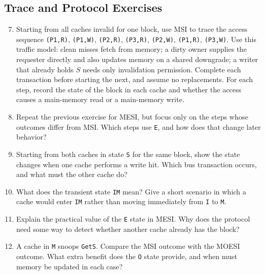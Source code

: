 \subsection*{Trace and Protocol Exercises}
\begin{enumerate}
    \setcounter{enumi}{6}
    \setlength{\itemsep}{0.45em}
    \item Starting from all caches invalid for one block, use MSI to trace the access sequence \texttt{(P1,R)}, \texttt{(P1,W)}, \texttt{(P2,R)}, \texttt{(P3,R)}, \texttt{(P2,W)}, \texttt{(P1,R)}, \texttt{(P3,W)}.
    Use this traffic model: clean misses fetch from memory; a dirty owner supplies the requester directly and also updates memory on a shared downgrade; a writer that already holds $S$ needs only invalidation permission.
    Complete each transaction before starting the next, and assume no replacements.
    For each step, record the state of the block in each cache and whether the access causes a main-memory read or a main-memory write.
    \item Repeat the previous exercise for MESI, but focus only on the steps whose outcomes differ from MSI. Which steps use \texttt{E}, and how does that change later behavior?
    \item Starting from both caches in state \texttt{S} for the same block, show the state changes when one cache performs a write hit.
    Which bus transaction occurs, and what must the other cache do?
    \item What does the transient state \texttt{IM} mean?
    Give a short scenario in which a cache would enter \texttt{IM} rather than moving immediately from \texttt{I} to \texttt{M}.
    \item Explain the practical value of the \texttt{E} state in MESI. Why does the protocol need some way to detect whether another cache already has the block?
    \item A cache in \texttt{M} snoops \texttt{GetS}.
    Compare the MSI outcome with the MOESI outcome.
    What extra benefit does the \texttt{O} state provide, and when must memory be updated in each case?
\end{enumerate}

